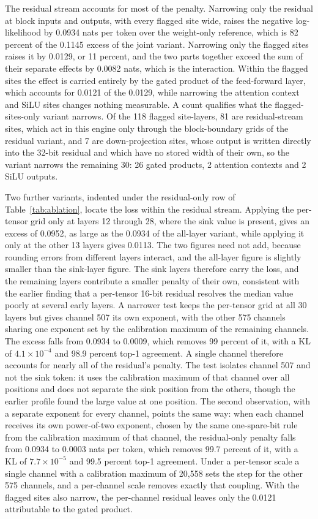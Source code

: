 \documentclass[11pt]{article}
\begin{document}
The residual stream accounts for most of the penalty. Narrowing only the residual at block inputs and outputs, with every flagged site wide, raises the negative log-likelihood by 0.0934 nats per token over the weight-only reference, which is 82 percent of the 0.1145 excess of the joint variant. Narrowing only the flagged sites raises it by 0.0129, or 11 percent, and the two parts together exceed the sum of their separate effects by 0.0082 nats, which is the interaction. Within the flagged sites the effect is carried entirely by the gated product of the feed-forward layer, which accounts for 0.0121 of the 0.0129, while narrowing the attention context and SiLU sites changes nothing measurable. A count qualifies what the flagged-sites-only variant narrows. Of the 118 flagged site-layers, 81 are residual-stream sites, which act in this engine only through the block-boundary grids of the residual variant, and 7 are down-projection sites, whose output is written directly into the 32-bit residual and which have no stored width of their own, so the variant narrows the remaining 30: 26 gated products, 2 attention contexts and 2 SiLU outputs.

Two further variants, indented under the residual-only row of Table~\ref{tab:ablation}, locate the loss within the residual stream. Applying the per-tensor grid only at layers 12 through 28, where the sink value is present, gives an excess of 0.0952, as large as the 0.0934 of the all-layer variant, while applying it only at the other 13 layers gives 0.0113. The two figures need not add, because rounding errors from different layers interact, and the all-layer figure is slightly smaller than the sink-layer figure. The sink layers therefore carry the loss, and the remaining layers contribute a smaller penalty of their own, consistent with the earlier finding that a per-tensor 16-bit residual resolves the median value poorly at several early layers. A narrower test keeps the per-tensor grid at all 30 layers but gives channel 507 its own exponent, with the other 575 channels sharing one exponent set by the calibration maximum of the remaining channels. The excess falls from 0.0934 to 0.0009, which removes 99 percent of it, with a KL of $4.1\times10^{-4}$ and 98.9 percent top-1 agreement. A single channel therefore accounts for nearly all of the residual's penalty. The test isolates channel 507 and not the sink token: it uses the calibration maximum of that channel over all positions and does not separate the sink position from the others, though the earlier profile found the large value at one position. The second observation, with a separate exponent for every channel, points the same way: when each channel receives its own power-of-two exponent, chosen by the same one-spare-bit rule from the calibration maximum of that channel, the residual-only penalty falls from 0.0934 to 0.0003 nats per token, which removes 99.7 percent of it, with a KL of $7.7\times10^{-5}$ and 99.5 percent top-1 agreement. Under a per-tensor scale a single channel with a calibration maximum of 20,558 sets the step for the other 575 channels, and a per-channel scale removes exactly that coupling. With the flagged sites also narrow, the per-channel residual leaves only the 0.0121 attributable to the gated product.
\end{document}
